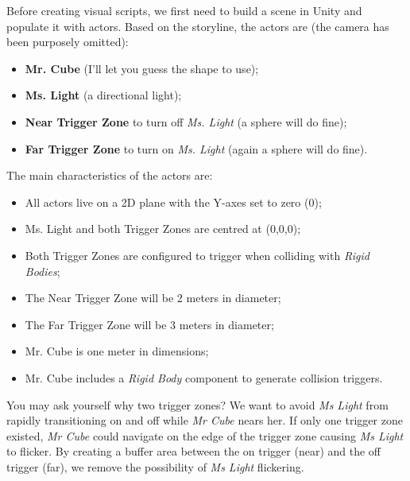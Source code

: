 Before creating visual scripts, we first need to build a scene in Unity and populate it with actors. Based on the storyline, the actors are (the camera has been purposely omitted):

\begin{itemize}
\item \textbf{Mr. Cube} (I'll let you guess the shape to use);

\item \textbf{Ms. Light} (a directional light);

\item \textbf{Near Trigger Zone} to turn off \emph{Ms. Light} (a sphere will do fine);

\item \textbf{Far Trigger Zone} to turn on \emph{Ms. Light} (again a sphere will do fine).

\end{itemize}

The main characteristics of the actors are:

\begin{itemize}
\item All actors live on a 2D plane with the Y-axes set to zero (0);

\item Ms. Light and both Trigger Zones are centred at (0,0,0);

\item Both Trigger Zones are configured to trigger when colliding with \emph{Rigid Bodies};

\item The Near Trigger Zone will be 2 meters in diameter;

\item The Far Trigger Zone will be 3 meters in diameter;

\item Mr. Cube is one meter in dimensions;

\item Mr. Cube includes a \emph{Rigid Body} component to generate collision triggers.

\end{itemize}

You may ask yourself why two trigger zones? We want to avoid \emph{Ms Light} from rapidly transitioning on and off while \emph{Mr Cube} nears her. If only one trigger zone existed, \emph{Mr Cube} could navigate on the edge of the trigger zone causing \emph{Ms Light} to flicker. By creating a buffer area between the on trigger (near) and the off trigger (far), we remove the possibility of \emph{Ms Light} flickering.

